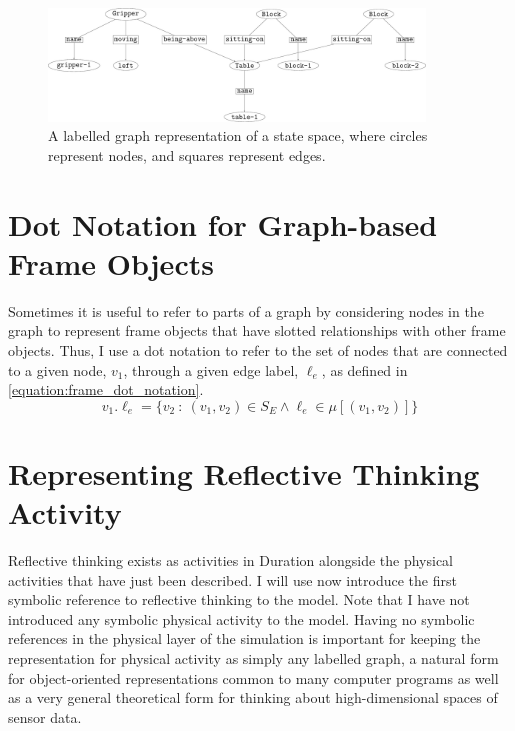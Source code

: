 \begin{figure}
\includegraphics[width=10cm]{gfx/simulation_example_state}
\caption[A labelled graph representation of a state space.]{A labelled graph representation of a state space, where circles represent nodes, and squares represent edges.}
\label{figure:simulation_example_state}
\end{figure}

\section{Dot Notation for Graph-based Frame Objects}

Sometimes it is useful to refer to parts of a graph by considering
nodes in the graph to represent frame objects that have slotted
relationships with other frame objects.  Thus, I use a dot notation to
refer to the set of nodes that are connected to a given node, $v_1$,
through a given edge label, $\ell_e$, as defined in
{\mbox{\autoref{equation:frame_dot_notation}}}.
\begin{equation}
\label{equation:frame_dot_notation}
v_1.\ell_e = \{v_2 ~:~ (v_1, v_2) \in S_E \wedge \ell_e \in \mu[(v_1, v_2)]\}
\end{equation}

\section{Representing Reflective Thinking Activity}

Reflective thinking exists as activities in Duration alongside the
physical activities that have just been described.  I will use now
introduce the first symbolic reference to reflective thinking to the
model.  Note that I have not introduced any symbolic physical activity
to the model.  Having no symbolic references in the physical layer of
the simulation is important for keeping the representation for
physical activity as simply any labelled graph, a natural form for
object-oriented representations common to many computer programs as
well as a very general theoretical form for thinking about
high-dimensional spaces of sensor data.

